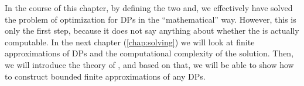 In the course of this chapter, by defining the two \FixFunMinRes and\linebreak[0] \FixResMaxFun, we effectively have solved the problem of optimization for DPs in the ``mathematical'' way.
However, this is only the first step, because it does not say anything about whether the  is actually computable.
In the next chapter (\cref{chap:solving}) we will look at finite approximations of DPs and the computational complexity of the solution.
Then, we will introduce the theory of , and based on that, we will be able to show how to construct bounded finite approximations of any DPs.
